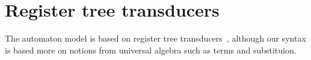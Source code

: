 


\section{Register tree transducers}
\label{sec:stt}
The automaton model is based on register tree transducers~\cite{alur2017streaming}, although our syntax is based more on notions from universal algebra such as terms and substituion.





